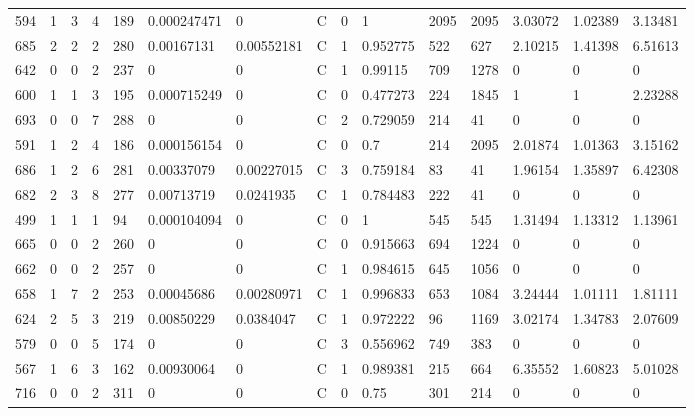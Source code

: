 \begin{latin}
\begin{longtable}{lllllllllllllll}
	594 & 1  & 3   & 4  & 189 & 0.000247471    & 0              & C & 0  & 1        & 2095 & 2095 & 3.03072 & 1.02389 & 3.13481 \\
	685 & 2  & 2   & 2  & 280 & 0.00167131     & 0.00552181     & C & 1  & 0.952775 & 522  & 627  & 2.10215 & 1.41398 & 6.51613 \\
	642 & 0  & 0   & 2  & 237 & 0              & 0              & C & 1  & 0.99115  & 709  & 1278 & 0       & 0       & 0       \\
	600 & 1  & 1   & 3  & 195 & 0.000715249    & 0              & C & 0  & 0.477273 & 224  & 1845 & 1       & 1       & 2.23288 \\
	693 & 0  & 0   & 7  & 288 & 0              & 0              & C & 2  & 0.729059 & 214  & 41   & 0       & 0       & 0       \\
	591 & 1  & 2   & 4  & 186 & 0.000156154    & 0              & C & 0  & 0.7      & 214  & 2095 & 2.01874 & 1.01363 & 3.15162 \\
	686 & 1  & 2   & 6  & 281 & 0.00337079     & 0.00227015     & C & 3  & 0.759184 & 83   & 41   & 1.96154 & 1.35897 & 6.42308 \\
	682 & 2  & 3   & 8  & 277 & 0.00713719     & 0.0241935      & C & 1  & 0.784483 & 222  & 41   & 0       & 0       & 0       \\
	499 & 1  & 1   & 1  & 94  & 0.000104094    & 0              & C & 0  & 1        & 545  & 545  & 1.31494 & 1.13312 & 1.13961 \\
	665 & 0  & 0   & 2  & 260 & 0              & 0              & C & 0  & 0.915663 & 694  & 1224 & 0       & 0       & 0       \\
	662 & 0  & 0   & 2  & 257 & 0              & 0              & C & 1  & 0.984615 & 645  & 1056 & 0       & 0       & 0       \\
	658 & 1  & 7   & 2  & 253 & 0.00045686     & 0.00280971     & C & 1  & 0.996833 & 653  & 1084 & 3.24444 & 1.01111 & 1.81111 \\
	624 & 2  & 5   & 3  & 219 & 0.00850229     & 0.0384047      & C & 1  & 0.972222 & 96   & 1169 & 3.02174 & 1.34783 & 2.07609 \\
	579 & 0  & 0   & 5  & 174 & 0              & 0              & C & 3  & 0.556962 & 749  & 383  & 0       & 0       & 0       \\
	567 & 1  & 6   & 3  & 162 & 0.00930064     & 0              & C & 1  & 0.989381 & 215  & 664  & 6.35552 & 1.60823 & 5.01028 \\
	716 & 0  & 0   & 2  & 311 & 0              & 0              & C & 0  & 0.75     & 301  & 214  & 0       & 0       & 0       \\

\end{longtable}
\end{latin}
